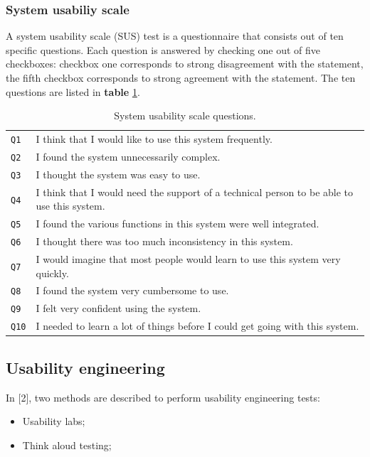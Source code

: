 \subsubsection{System usabiliy scale}

A system usability scale (SUS) test is a questionnaire that consists out of ten specific questions. Each question is answered by checking one out of five checkboxes: checkbox one corresponds to strong disagreement with the statement, the fifth checkbox corresponds to strong agreement with the statement. The ten questions are listed in \textbf{table} \ref{table:sus_questions}.

\begin{table}[H]
	\caption{System usability scale questions.}
	\begin{tabular}{ p{20px} | p{410px} }
		\hline
		\texttt{Q1} 	&	I think that I would like to use this system frequently. \\
		\texttt{Q2}		&	I found the system unnecessarily complex. \\
		\texttt{Q3}		&	I thought the system was easy to use. \\
		\texttt{Q4} 	&	I think that I would need the support of a technical person to be able to use this system. \\
		\texttt{Q5}		&	I found the various functions in this system were well integrated. \\
		\texttt{Q6}		&	I thought there was too much inconsistency in this system. \\
		\texttt{Q7} 	&	I would imagine that most people would learn to use this system very quickly.  \\
		\texttt{Q8}		&	I found the system very cumbersome to use. \\
		\texttt{Q9}		& I felt very confident using the system. \\
		\texttt{Q10}	& I needed to learn a lot of things before I could get going with this system. \\
		\hline
	\end{tabular}
	\label{table:sus_questions}
\end{table}


\subsection{Usability engineering}

In [2], two methods are described to perform usability engineering tests:
\begin{itemize}
	\item Usability labs;
	\item Think aloud testing;
\end{itemize}

